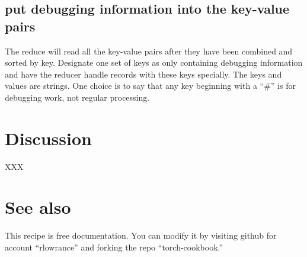 \documentclass{article}
\begin{document}
\subsection{put debugging information into the key-value pairs}

The reduce will read all the key-value pairs after they have been
combined and sorted by key. Designate one set of keys as only containing
debugging information and have the reducer handle records with these
keys specially. The keys and values are strings. One choice is to say
that any key beginning with a ``#'' is for debugging work, not regular
processing.


\section{Discussion}

XXX

\section{See also}

This recipe is free documentation. You can modify it by visiting
github for account ``rlowrance'' and forking the repo
``torch-cookbook.''
\end{document}
